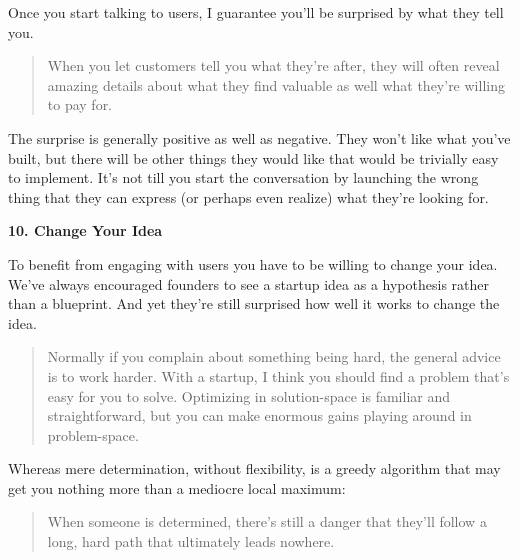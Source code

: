                   Once you start talking to users, I guarantee you'll be
                  surprised by what they tell you.
                  \begin{quote}

                    When you let customers tell you what they're after, they
                    will often reveal amazing details about what they find
                    valuable as well what they're willing to pay for.
                  
\end{quote}

                  The surprise is generally positive as well as negative. They
                  won't like what you've built, but there will be other things
                  they would like that would be trivially easy to implement.
                  It's not till you start the conversation by launching the
                  wrong thing that they can express (or perhaps even realize)
                  what they're looking for.


                  \textbf{10. Change Your Idea}

To benefit from
                  engaging with users you have to be willing to change your
                  idea. We've always encouraged founders to see a startup idea
                  as a hypothesis rather than a blueprint. And yet they're still
                  surprised how well it works to change the idea.
                  \begin{quote}

                    Normally if you complain about something being hard, the
                    general advice is to work harder. With a startup, I think
                    you should find a problem that's easy for you to solve.
                    Optimizing in solution-space is familiar and
                    straightforward, but you can make enormous gains playing
                    around in problem-space.
                  
\end{quote}

                  Whereas mere determination, without flexibility, is a greedy
                  algorithm that may get you nothing more than a mediocre local
                  maximum:
                  \begin{quote}

                    When someone is determined, there's still a danger that
                    they'll follow a long, hard path that ultimately leads
                    nowhere.
                  
\end{quote}

